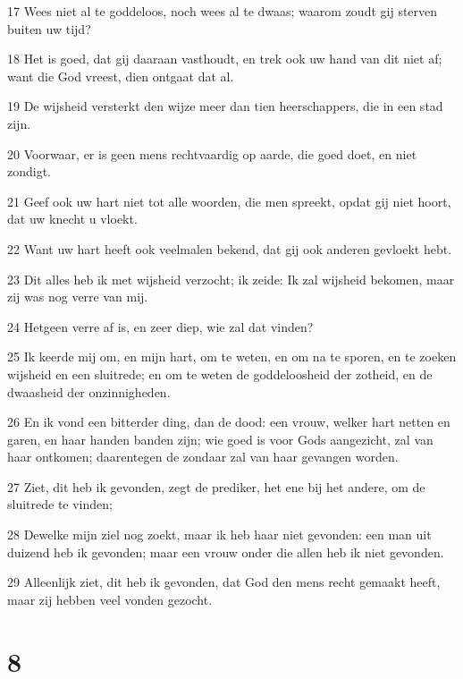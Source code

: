 \par 17 Wees niet al te goddeloos, noch wees al te dwaas; waarom zoudt gij sterven buiten uw tijd?
\par 18 Het is goed, dat gij daaraan vasthoudt, en trek ook uw hand van dit niet af; want die God vreest, dien ontgaat dat al.
\par 19 De wijsheid versterkt den wijze meer dan tien heerschappers, die in een stad zijn.
\par 20 Voorwaar, er is geen mens rechtvaardig op aarde, die goed doet, en niet zondigt.
\par 21 Geef ook uw hart niet tot alle woorden, die men spreekt, opdat gij niet hoort, dat uw knecht u vloekt.
\par 22 Want uw hart heeft ook veelmalen bekend, dat gij ook anderen gevloekt hebt.
\par 23 Dit alles heb ik met wijsheid verzocht; ik zeide: Ik zal wijsheid bekomen, maar zij was nog verre van mij.
\par 24 Hetgeen verre af is, en zeer diep, wie zal dat vinden?
\par 25 Ik keerde mij om, en mijn hart, om te weten, en om na te sporen, en te zoeken wijsheid en een sluitrede; en om te weten de goddeloosheid der zotheid, en de dwaasheid der onzinnigheden.
\par 26 En ik vond een bitterder ding, dan de dood: een vrouw, welker hart netten en garen, en haar handen banden zijn; wie goed is voor Gods aangezicht, zal van haar ontkomen; daarentegen de zondaar zal van haar gevangen worden.
\par 27 Ziet, dit heb ik gevonden, zegt de prediker, het ene bij het andere, om de sluitrede te vinden;
\par 28 Dewelke mijn ziel nog zoekt, maar ik heb haar niet gevonden: een man uit duizend heb ik gevonden; maar een vrouw onder die allen heb ik niet gevonden.
\par 29 Alleenlijk ziet, dit heb ik gevonden, dat God den mens recht gemaakt heeft, maar zij hebben veel vonden gezocht.

\chapter{8}

